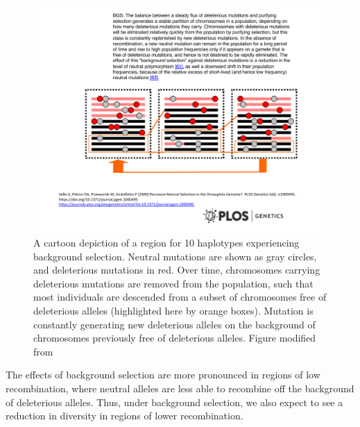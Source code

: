 \begin{figure}
\begin{center}
\includegraphics[width=0.75 \textwidth]{figures/Hitchhiking/BGS_cartoon.pdf}
\end{center}
\caption{A cartoon depiction of a region for 10 haplotypes
  experiencing background selection. Neutral mutations are shown as
  gray circles, and deleterious mutations in red. Over time,
  chromosomes carrying deleterious mutations are removed from the
  population, such that most individuals are descended from a subset of
  chromosomes free of deleterious alleles (highlighted here by orange boxes). Mutation is constantly generating new deleterious alleles on
  the background of chromosomes previously free of deleterious
  alleles. Figure modified from \citet{sella2009pervasive}} \label{fig:BGS_cartoon}
\end{figure}
The effects of background selection are more pronounced in regions of low recombination, where
neutral alleles are less able to recombine off the background of deleterious
alleles. Thus, under background selection, we also expect to see a
reduction in diversity in regions of lower recombination. 

